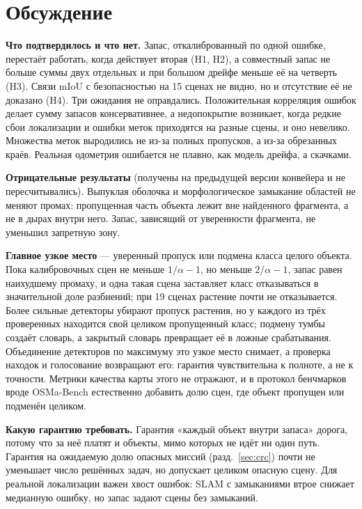 \section{Обсуждение}\label{sec:discussion}

\textbf{Что подтвердилось и что нет.} Запас, откалиброванный по одной ошибке, перестаёт работать, когда действует вторая (H1, H2), а совместный запас не больше суммы двух отдельных и при большом дрейфе меньше её на четверть (H3). Связи mIoU с безопасностью на 15 сценах не видно, но и отсутствие её не доказано (H4). Три ожидания не оправдались. Положительная корреляция ошибок делает сумму запасов консервативнее, а недопокрытие возникает, когда редкие сбои локализации и ошибки меток приходятся на разные сцены, и оно невелико. Множества меток выродились не из-за полных пропусков, а из-за обрезанных краёв. Реальная одометрия ошибается не плавно, как модель дрейфа, а скачками.

\textbf{Отрицательные результаты} (получены на предыдущей версии конвейера и не пересчитывались). Выпуклая оболочка и морфологическое замыкание областей не меняют промах: пропущенная часть объекта лежит вне найденного фрагмента, а не в дырах внутри него. Запас, зависящий от уверенности фрагмента, не уменьшил запретную зону.

\textbf{Главное узкое место} --- уверенный пропуск или подмена класса целого объекта. Пока калибровочных сцен не меньше $1/\alpha - 1$, но меньше $2/\alpha - 1$, запас равен наихудшему промаху, и одна такая сцена заставляет класс отказываться в значительной доле разбиений; при 19 сценах растение почти не отказывается. Более сильные детекторы убирают пропуск растения, но у каждого из трёх проверенных находится свой целиком пропущенный класс; подмену тумбы создаёт словарь, а закрытый словарь превращает её в ложные срабатывания. Объединение детекторов по максимуму это узкое место снимает, а проверка находок и голосование возвращают его: гарантия чувствительна к полноте, а не к точности. Метрики качества карты этого не отражают, и в протокол бенчмарков вроде OSMa-Bench естественно добавить долю сцен, где объект пропущен или подменён целиком.

\textbf{Какую гарантию требовать.} Гарантия «каждый объект внутри запаса» дорога, потому что за неё платят и объекты, мимо которых не идёт ни один путь. Гарантия на ожидаемую долю опасных миссий (разд.~\ref{sec:crc}) почти не уменьшает число решённых задач, но допускает целиком опасную сцену. Для реальной локализации важен хвост ошибок: SLAM с замыканиями втрое снижает медианную ошибку, но запас задают сцены без замыканий.

